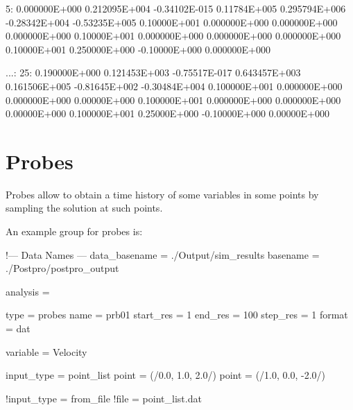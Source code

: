 \begin{inputfile}
  5: 0.000000E+000    0.212095E+004    -0.34102E-015  0.11784E+005  
     0.295794E+006    -0.28342E+004    -0.53235E+005  0.10000E+001  
     0.000000E+000    0.000000E+000    0.000000E+000  0.10000E+001  
     0.000000E+000    0.000000E+000    0.000000E+000  0.10000E+001  
     0.250000E+000    -0.10000E+000    0.000000E+000
  
...:
  25: 0.190000E+000  0.121453E+003 -0.75517E-017  0.643457E+003  
      0.161506E+005  -0.81645E+002 -0.30484E+004  0.100000E+001  
      0.000000E+000  0.000000E+000  0.00000E+000  0.100000E+001  
      0.000000E+000  0.000000E+000  0.00000E+000  0.100000E+001  
      0.25000E+000   -0.10000E+000  0.00000E+000
\end{inputfile}



\section{Probes}

Probes allow to obtain a time history of some variables in some points by 
sampling the solution at such points. 

An example  group for probes is:

\begin{inputfile}[frame=single, caption={dust\_post.in for probes}, 
  label={file:dust_post.in_probes}]
!--- Data Names ---
data_basename = ./Output/sim_results
basename =     ./Postpro/postpro_output

analysis = {

type = probes
name = prb01
start_res = 1
end_res   = 100 
step_res  = 1
format = dat

variable = Velocity

input_type = point_list
point = (/0.0, 1.0, 2.0/)
point = (/1.0, 0.0, -2.0/)

!input_type = from_file
!file = point_list.dat

}
\end{inputfile}


